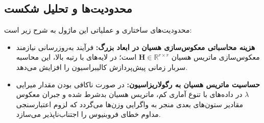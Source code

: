 \subsection{محدودیت‌ها و تحلیل شکست}
محدودیت‌های ساختاری و عملیاتی این ماژول به شرح زیر است:
\begin{itemize}
    \item \textbf{هزینه محاسباتی معکوس‌سازی هسیان در ابعاد بزرگ:} فرآیند به‌روزرسانی  نیازمند معکوس‌سازی ماتریس هسیان $\mathbf{H} \in \mathbb{R}^{r \times r}$ است؛ در لایه‌های با رتبه بالا، این محاسبه سربار زمانی پیش‌پردازش کالیبراسیون را افزایش می‌دهد.
    \item \textbf{حساسیت ماتریس هسیان به رگولاریزاسیون:} در صورت ناکافی بودن مقدار میرایی $\lambda$ در داده‌های با تنوع آماری کم، ماتریس هسیان بدشرط شده و جبران معکوس مقادیر ستون‌های بعدی منجر به واگرایی وزن‌ها می‌گردد که لزوم اعتبارسنجی مداوم خطای فروبنیوس را اجتناب‌ناپذیر می‌سازد.
\end{itemize}
